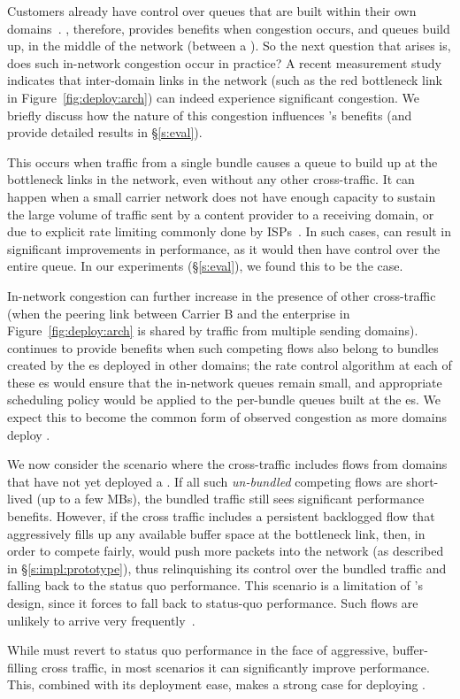 Customers already have control over queues that are built within their own domains~\cite{swan, b4, bwe}. \name, therefore, provides benefits when congestion occurs, and queues build up, in the middle of the network (\ie between a \pair).  
So the next question that arises is, does such in-network congestion occur in practice? A recent measurement study~\cite{inferring-interdomain-congestion} indicates that inter-domain links in the network (such as the red bottleneck link in Figure~\ref{fig:deploy:arch}) can indeed experience significant congestion. 
We briefly discuss how the nature of this congestion influences \name's benefits (and provide detailed results in \S\ref{s:eval}).

 This occurs when traffic from a single bundle causes a queue to build up at the bottleneck links in the network, even without any other cross-traffic. It can happen when a small carrier network does not have enough capacity to sustain the large volume of traffic sent by a content provider to a receiving domain, or due to explicit rate limiting commonly done by ISPs~\cite{isp-throttle-1, isp-throttle-2, isp-throttle-3}. In such cases, \name can result in
significant improvements in performance, as it would then have control over the entire queue. In our experiments (\S\ref{s:eval}), we found this to be the case.

 In-network congestion can further increase in the presence of other cross-traffic (\eg when the peering link between Carrier B and the enterprise in Figure~\ref{fig:deploy:arch} is shared by traffic from multiple sending domains). \name continues to provide benefits when such competing flows also belong to bundles created by the {\inbox}es deployed in other domains; the rate control algorithm at each of these {\inbox}es would ensure that the in-network queues remain small, and appropriate scheduling policy would be applied to the per-bundle queues built at the {\inbox}es.
We expect this to become the common form of observed congestion as more domains deploy \name. 

 We now consider the scenario where the cross-traffic includes flows from domains that have not yet deployed a \name. If all such \emph{un-bundled} competing flows are short-lived (up to a few MBs), the bundled traffic still sees significant performance benefits. 
However, if the cross traffic includes a persistent backlogged flow that aggressively fills up any available buffer space at the bottleneck link, then, in order to compete fairly, \name would push more packets into the network (as described in \S\ref{s:impl:prototype}), thus relinquishing its control over the bundled traffic and falling back to the status quo performance. 
This scenario is a limitation of \name's design, since it forces \name to fall back to status-quo performance.
 Such flows are unlikely to arrive very frequently~\cite{caida-dataset}. 

\vspace{0.05in}
 While \name must revert to status quo performance in the face of aggressive, buffer-filling cross traffic, in most scenarios it can significantly improve performance.
This, combined with its deployment ease, makes a strong case for deploying \name. 

